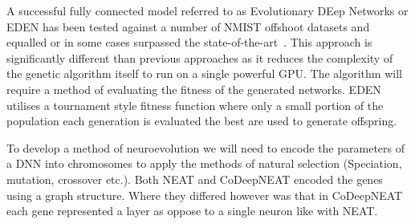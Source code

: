 \documentclass[]{monthly-report}
\begin{document}
A successful fully connected model referred to as Evolutionary DEep Networks or EDEN has been tested against a number of NMIST offshoot datasets and equalled or in some cases surpassed the state-of-the-art~\cite{2017arXiv170909161D}. This approach is significantly different than previous approaches as it reduces the complexity of the genetic algorithm itself to run on a single powerful GPU. The algorithm will require a method of evaluating the fitness of the generated networks. EDEN utilises a tournament style fitness function where only a small portion of the population each generation is evaluated the best are used to generate offspring.  

To develop a method of neuroevolution we will need to encode the parameters of a DNN into chromosomes to apply the methods of natural selection (Speciation, mutation, crossover etc.). Both NEAT and CoDeepNEAT encoded the genes using a graph structure. Where they differed however was that in CoDeepNEAT each gene represented a layer as oppose to a single neuron like with NEAT. 


\begingroup
\raggedright
{}
\endgroup



\label{last_page}

 
\end{document}
